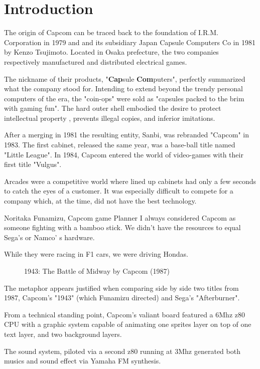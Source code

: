 \chapter{Introduction} 

The origin of Capcom can be traced back to the foundation of I.R.M. Corporation in 1979 and and its subsidiary Japan Capsule Computers Co in 1981 by Kenzo Tsujimoto. Located in Osaka prefecture, the two companies respectively manufactured and distributed electrical games.

The nickname of their products, "\textbf{Cap}sule \textbf{Com}puters", perfectly summarized what the company stood for. Intending to extend beyond the trendy personal computers of the era, the "coin-ops" were sold as "capsules packed to the brim with gaming fun". The hard outer shell embodied the desire to protect intellectual property , prevents illegal copies, and inferior imitations.

After a merging in 1981 the resulting entity, Sanbi, was rebranded "Capcom" in 1983. The first cabinet, released the same year, was a base-ball title named "Little League". In 1984, Capcom entered the world of video-games with their first title "Vulgus".

Arcades were a competitive world where lined up cabinets had only a few seconds to catch the eyes of a customer. It was especially difficult to compete for a company which, at the time, did not have the best technology.

\begin{q}{Noritaka Funamizu, Capcom game Planner}
I always considered Capcom as someone fighting with a bamboo stick. We didn't have the resources to equal Sega's or Namco'
s hardware. 

While they were racing in F1 cars, we were driving Hondas.
\end{q}


\begin{figure}[H]
\caption*{1943: The Battle of Midway by Capcom (1987)}
\end{figure}

The metaphor appears justified when comparing side by side two titles from 1987, Capcom's "1943" (which Funamizu directed) and Sega's "Afterburner".

From a technical standing point, Capcom's valiant board featured a 6Mhz z80 CPU with a graphic system capable of animating one sprites layer on top of one text layer, and two background layers. 

The sound system, piloted via a second z80 running at 3Mhz generated both musics and sound effect via Yamaha FM synthesis.


